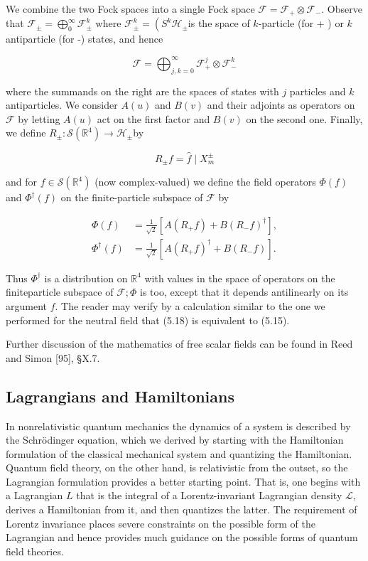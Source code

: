 \documentclass[10pt, letterpaper]{article}
\begin{document}
We combine the two Fock spaces into a single Fock space $\mathcal{F}=\mathcal{F}_{+} \otimes \mathcal{F}_{-}$. Observe that $\mathcal{F}_{ \pm}=\bigoplus_{0}^{\infty} \mathcal{F}_{ \pm}^{k}$ where $\mathcal{F}_{ \pm}^{k}=\left(S^{k} \mathcal{H}_{ \pm}\right.$is the space of $k$-particle (for + ) or $k$ antiparticle (for -) states, and hence

$$
\mathcal{F}=\bigoplus_{j, k=0}^{\infty} \mathcal{F}_{+}^{j} \otimes \mathcal{F}_{-}^{k}
$$

where the summands on the right are the spaces of states with $j$ particles and $k$ antiparticles. We consider $A(u)$ and $B(v)$ and their adjoints as operators on $\mathcal{F}$ by letting $A(u)$ act on the first factor and $B(v)$ on the second one. Finally, we define $R_{ \pm}: \mathcal{S}\left(\mathbb{R}^{4}\right) \rightarrow \mathcal{H}_{ \pm}$by

$$
R_{ \pm} f=\hat{f} \mid X_{m}^{ \pm}
$$

and for $f \in \mathcal{S}\left(\mathbb{R}^{4}\right)$ (now complex-valued) we define the field operators $\Phi(f)$ and $\Phi^{\dagger}(f)$ on the finite-particle subspace of $\mathcal{F}$ by

$$
\begin{aligned}
\Phi(f) & =\frac{1}{\sqrt{2}}\left[A\left(R_{+} f\right)+B\left(R_{-} f\right)^{\dagger}\right], \\
\Phi^{\dagger}(f) & =\frac{1}{\sqrt{2}}\left[A\left(R_{+} f\right)^{\dagger}+B\left(R_{-} f\right)\right] .
\end{aligned}
$$

Thus $\Phi^{\dagger}$ is a distribution on $\mathbb{R}^{4}$ with values in the space of operators on the finiteparticle subspace of $\mathcal{F} ; \Phi$ is too, except that it depends antilinearly on its argument $f$. The reader may verify by a calculation similar to the one we performed for the neutral field that (5.18) is equivalent to (5.15).

Further discussion of the mathematics of free scalar fields can be found in Reed and Simon [95], §X.7.

\subsection*{Lagrangians and Hamiltonians}
In nonrelativistic quantum mechanics the dynamics of a system is described by the Schrödinger equation, which we derived by starting with the Hamiltonian formulation of the classical mechanical system and quantizing the Hamiltonian. Quantum field theory, on the other hand, is relativistic from the outset, so the Lagrangian formulation provides a better starting point. That is, one begins with a Lagrangian $L$ that is the integral of a Lorentz-invariant Lagrangian density $\mathcal{L}$, derives a Hamiltonian from it, and then quantizes the latter. The requirement of Lorentz invariance places severe constraints on the possible form of the Lagrangian and hence provides much guidance on the possible forms of quantum field theories.
\end{document}

